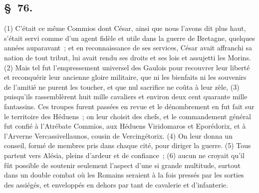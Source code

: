 \documentclass[french,twoside]{book} %
\begin{document}
\subsection[{§ 76.}]{ \textsc{§ 76.} }
\noindent (1) C'était ce même Commios dont César, ainsi que nous l’avons dit plus haut, s’était servi comme d’un agent fidèle et utile dans la guerre de Bretagne, quelques années auparavant ; et en reconnaissance de ses services, César avait affranchi sa nation de tout tribut, lui avait rendu ses droits et ses lois et assujetti les Morins. (2) Mais tel fut l’empressement universel des Gaulois pour recouvrer leur liberté et reconquérir leur ancienne gloire militaire, que ni les bienfaits ni les souvenirs de l’amitié ne purent les toucher, et que nul sacrifice ne coûta à leur zèle, (3) puisqu’ils rassemblèrent huit mille cavaliers et environ deux cent quarante mille fantassins. Ces troupes furent passées en revue et le dénombrement en fut fait sur le territoire des Héduens ; on leur choisit des chefs, et le commandement général fut confié à l’Atrébate Commios, aux Héduens Viridomaros et Eporédorix, et à l’Arverne Vercassivellaunos, cousin de Vercingétorix. (4) On leur donna un conseil, formé de membres pris dans chaque cité, pour diriger la guerre. (5) Tous partent vers Alésia, pleins d’ardeur et de confiance ; (6) aucun ne croyait qu’il fût possible de soutenir seulement l’aspect d’une si grande multitude, surtout dans un double combat où les Romains seraient à la fois pressés par les sorties des assiégés, et enveloppés en dehors par tant de cavalerie et d’infanterie.
\end{document}
